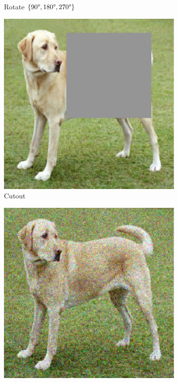 \begin{figure}[t]
\begin{subfigure}{.19\textwidth}
  \caption{Rotate {\tiny$\{90\degree,180\degree,270\degree\}$}}
\end{subfigure}\begin{subfigure}{.19\textwidth}
  \centering
  \includegraphics[width=0.9\linewidth]{chapters/assets/ssl_figs/transforms/img_cutout.pdf}
  \caption{Cutout}
\end{subfigure}\begin{subfigure}{.19\textwidth}
  \centering
  \includegraphics[width=0.9\linewidth]{chapters/assets/ssl_figs/transforms/img_noise.pdf}

\end{subfigure}
\end{figure}

